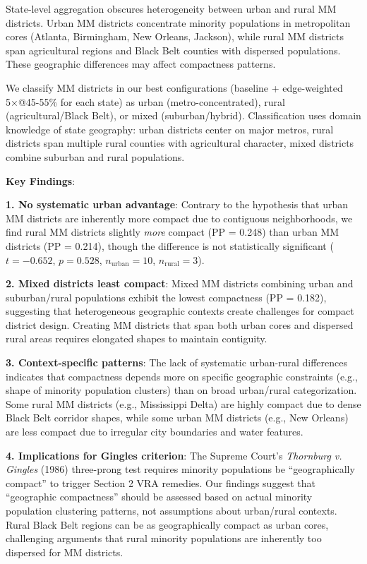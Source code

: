 State-level aggregation obscures heterogeneity between urban and rural MM districts. Urban MM districts concentrate minority populations in metropolitan cores (Atlanta, Birmingham, New Orleans, Jackson), while rural MM districts span agricultural regions and Black Belt counties with dispersed populations. These geographic differences may affect compactness patterns.

We classify MM districts in our best configurations (baseline + edge-weighted 5×@45-55\% for each state) as urban (metro-concentrated), rural (agricultural/Black Belt), or mixed (suburban/hybrid). Classification uses domain knowledge of state geography: urban districts center on major metros, rural districts span multiple rural counties with agricultural character, mixed districts combine suburban and rural populations.



\textbf{Key Findings}:

\textbf{1. No systematic urban advantage}: Contrary to the hypothesis that urban MM districts are inherently more compact due to contiguous neighborhoods, we find rural MM districts slightly \emph{more} compact (PP = 0.248) than urban MM districts (PP = 0.214), though the difference is not statistically significant ($t = -0.652$, $p = 0.528$, $n_{\text{urban}} = 10$, $n_{\text{rural}} = 3$).

\textbf{2. Mixed districts least compact}: Mixed MM districts combining urban and suburban/rural populations exhibit the lowest compactness (PP = 0.182), suggesting that heterogeneous geographic contexts create challenges for compact district design. Creating MM districts that span both urban cores and dispersed rural areas requires elongated shapes to maintain contiguity.

\textbf{3. Context-specific patterns}: The lack of systematic urban-rural differences indicates that compactness depends more on specific geographic constraints (e.g., shape of minority population clusters) than on broad urban/rural categorization. Some rural MM districts (e.g., Mississippi Delta) are highly compact due to dense Black Belt corridor shapes, while some urban MM districts (e.g., New Orleans) are less compact due to irregular city boundaries and water features.

\textbf{4. Implications for Gingles criterion}: The Supreme Court's \emph{Thornburg v. Gingles} (1986) three-prong test requires minority populations be ``geographically compact'' to trigger Section 2 VRA remedies. Our findings suggest that ``geographic compactness'' should be assessed based on actual minority population clustering patterns, not assumptions about urban/rural contexts. Rural Black Belt regions can be as geographically compact as urban cores, challenging arguments that rural minority populations are inherently too dispersed for MM districts.


